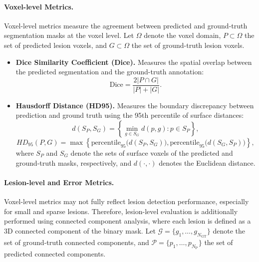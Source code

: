 \paragraph{Voxel-level Metrics.}
Voxel-level metrics measure the agreement between predicted and
ground-truth segmentation masks at the voxel level. Let $\Omega$ denote
the voxel domain, $P \subset \Omega$ the set of predicted lesion voxels,
and $G \subset \Omega$ the set of ground-truth lesion voxels.

\begin{itemize}
    \item \textbf{Dice Similarity Coefficient (Dice).} Measures the
    spatial overlap between the predicted segmentation and the
    ground-truth annotation:
    \begin{equation}
    \text{Dice} =
    \frac{2|P \cap G|}{|P| + |G|}.
    \end{equation}

    \item \textbf{Hausdorff Distance (HD95).} Measures the boundary
    discrepancy between prediction and ground truth using the 95th
    percentile of surface distances:
    \begin{equation}
    d(S_P,S_G) =
    \left\{
    \min_{g \in S_G} d(p,g) : p \in S_P
    \right\},
    \end{equation}
    \begin{equation}
    HD_{95}(P,G) =
    \max \left\{
    \mathrm{percentile}_{95}\big(d(S_P,S_G)\big),
    \mathrm{percentile}_{95}\big(d(S_G,S_P)\big)
    \right\},
    \end{equation}
    where $S_P$ and $S_G$ denote the sets of surface voxels of the
    predicted and ground-truth masks, respectively, and $d(\cdot,\cdot)$
    denotes the Euclidean distance.
\end{itemize}

\paragraph{Lesion-level and Error Metrics.}
Voxel-level metrics may not fully reflect lesion detection performance,
especially for small and sparse lesions. Therefore, lesion-level
evaluation is additionally performed using connected component analysis,
where each lesion is defined as a 3D connected component of the binary
mask. Let $\mathcal{G} = \{g_1, \dots, g_{N_{\mathrm{GT}}}\}$ denote the
set of ground-truth connected components, and
$\mathcal{P} = \{p_1, \dots, p_{N_{\mathrm{P}}}\}$ the set of predicted
connected components.

